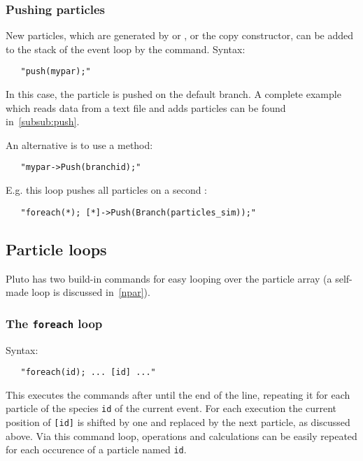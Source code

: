 {\subsubsection{Pushing particles}

New particles, which are generated by  or , or the copy
constructor, can be added to the stack of the event loop by the  command.
Syntax:

\begin{verbatim}
   "push(mypar);"
\end{verbatim}

In this case, the particle is pushed on the default branch. A complete
example which reads data from a text file and adds particles can be
found in~\ref{subsub:push}.

An alternative is to use a method:

\begin{verbatim}
   "mypar->Push(branchid);"
\end{verbatim}

E.g. this loop pushes all particles on a second :

\begin{verbatim}
   "foreach(*); [*]->Push(Branch(particles_sim));"
\end{verbatim}

\subsection{Particle loops}\label{sub:loops}

Pluto has two build-in commands for easy looping over the particle
array (a self-made loop is discussed in~\ref{npar}).

\subsubsection{The \texttt{foreach} loop}

Syntax:

\begin{verbatim}
   "foreach(id); ... [id] ..."
\end{verbatim}

This executes the commands after  until the end of the
line, repeating it for each particle of the species {\tt id} of the
current event.  For each execution the current position of {\tt [id]}
is shifted by one and replaced by the next particle, as discussed
above. Via this command loop, operations and calculations can be
easily repeated for each occurence of a particle named {\tt id}.

}
